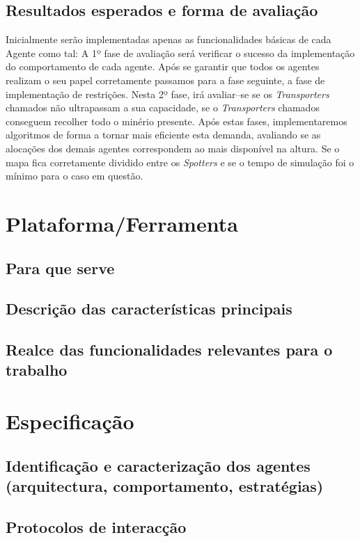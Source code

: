 \documentclass[a4paper, 12pt, twoside]{scrreprt}
\begin{document}
\section{Resultados esperados e forma de avaliação}
Inicialmente serão implementadas apenas as funcionalidades básicas de cada Agente como tal:
A 1º fase de avaliação será verificar o sucesso da implementação do comportamento de cada agente. Após se garantir que todos os agentes realizam o seu papel corretamente passamos para a fase seguinte, a fase de implementação de restrições. 
Nesta 2º fase, irá avaliar–se se os \textit{Transporters} chamados não ultrapassam a sua capacidade, se o \textit{Transporters} chamados conseguem recolher todo o minério presente. 
Após estas fases, implementaremos algoritmos de forma a tornar mais eficiente esta demanda, avaliando se as alocações dos demais agentes correspondem ao mais disponível na altura. Se o mapa fica corretamente dividido entre os \textit{Spotters} e se o tempo de simulação foi o mínimo para o caso em questão.

 
\chapter{Plataforma/Ferramenta}
\section{Para que serve}
\section{Descrição das características principais}
\section{Realce das funcionalidades relevantes para o trabalho}

\chapter{Especificação}
\section{Identificação e caracterização dos agentes (arquitectura, comportamento, estratégias)}
\section{Protocolos de interacção}
\end{document}
